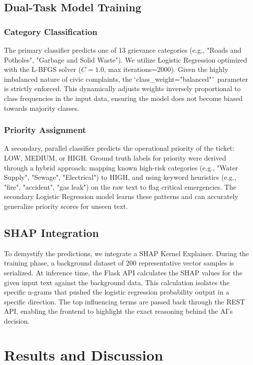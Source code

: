 \documentclass[conference]{IEEEtran}
\begin{document}
\subsection{Dual-Task Model Training}
\subsubsection{Category Classification}
The primary classifier predicts one of 13 grievance categories (e.g., "Roads and Potholes", "Garbage and Solid Waste"). We utilize Logistic Regression optimized with the L-BFGS solver ($C=1.0$, max iterations=2000). Given the highly imbalanced nature of civic complaints, the `class\_weight="balanced"` parameter is strictly enforced. This dynamically adjusts weights inversely proportional to class frequencies in the input data, ensuring the model does not become biased towards majority classes.

\subsubsection{Priority Assignment}
A secondary, parallel classifier predicts the operational priority of the ticket: LOW, MEDIUM, or HIGH. Ground truth labels for priority were derived through a hybrid approach: mapping known high-risk categories (e.g., "Water Supply", "Sewage", "Electrical") to HIGH, and using keyword heuristics (e.g., "fire", "accident", "gas leak") on the raw text to flag critical emergencies. The secondary Logistic Regression model learns these patterns and can accurately generalize priority scores for unseen text.

\subsection{SHAP Integration}
To demystify the predictions, we integrate a SHAP Kernel Explainer. During the training phase, a background dataset of 200 representative vector samples is serialized. At inference time, the Flask API calculates the SHAP values for the given input text against the background data. This calculation isolates the specific n-grams that pushed the logistic regression probability output in a specific direction. The top influencing terms are passed back through the REST API, enabling the frontend to highlight the exact reasoning behind the AI's decision.

\section{Results and Discussion}
\end{document}
